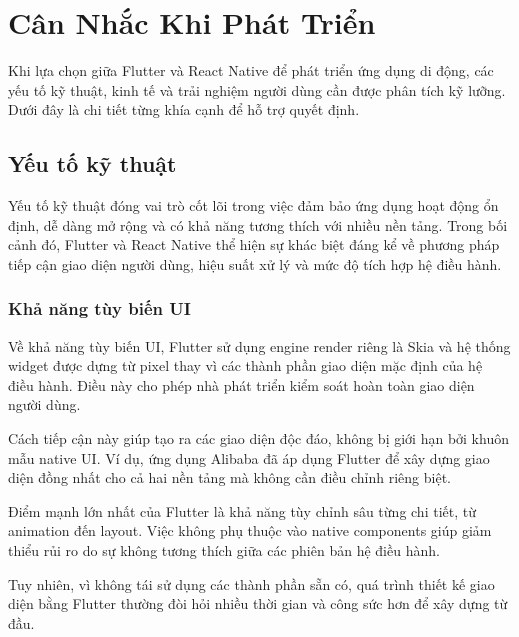 \section{Cân Nhắc Khi Phát Triển}


  Khi lựa chọn giữa Flutter và React Native để phát triển ứng dụng di động, các yếu tố kỹ thuật, kinh tế và trải nghiệm người dùng cần được phân tích kỹ lưỡng. Dưới đây là chi tiết từng khía cạnh để hỗ trợ quyết định.

\subsection{Yếu tố kỹ thuật}

Yếu tố kỹ thuật đóng vai trò cốt lõi trong việc đảm bảo ứng dụng hoạt động ổn định, dễ dàng mở rộng và có khả năng tương thích với nhiều nền tảng. Trong bối cảnh đó, Flutter và React Native thể hiện sự khác biệt đáng kể về phương pháp tiếp cận giao diện người dùng, hiệu suất xử lý và mức độ tích hợp hệ điều hành.

\subsubsection{Khả năng tùy biến UI}

Về khả năng tùy biến UI, Flutter sử dụng engine render riêng là Skia và hệ thống widget được dựng từ pixel thay vì các thành phần giao diện mặc định của hệ điều hành. Điều này cho phép nhà phát triển kiểm soát hoàn toàn giao diện người dùng.

\vspace{0.5em}

\indent Cách tiếp cận này giúp tạo ra các giao diện độc đáo, không bị giới hạn bởi khuôn mẫu native UI. Ví dụ, ứng dụng Alibaba đã áp dụng Flutter để xây dựng giao diện đồng nhất cho cả hai nền tảng mà không cần điều chỉnh riêng biệt.

\vspace{0.5em}

\indent Điểm mạnh lớn nhất của Flutter là khả năng tùy chỉnh sâu từng chi tiết, từ animation đến layout. Việc không phụ thuộc vào native components giúp giảm thiểu rủi ro do sự không tương thích giữa các phiên bản hệ điều hành.

\vspace{0.5em}

\indent Tuy nhiên, vì không tái sử dụng các thành phần sẵn có, quá trình thiết kế giao diện bằng Flutter thường đòi hỏi nhiều thời gian và công sức hơn để xây dựng từ đầu.

